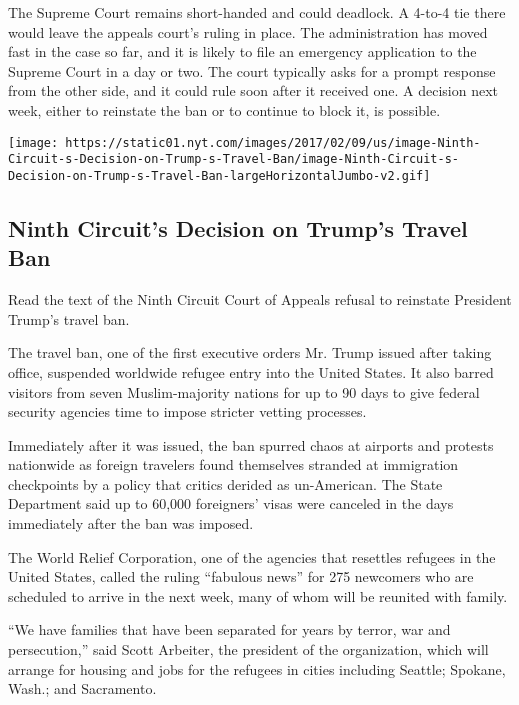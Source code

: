 The Supreme Court remains short-handed and could deadlock. A 4-to-4 tie
there would leave the appeals court's ruling in place. The
administration has moved fast in the case so far, and it is likely to
file an emergency application to the Supreme Court in a day or two. The
court typically asks for a prompt response from the other side, and it
could rule soon after it received one. A decision next week, either to
reinstate the ban or to continue to block it, is possible.

\href{https://www.nytimes.com/interactive/2017/02/09/us/document-Ninth-Circuit-s-Decision-on-Trump-s-Travel-Ban.html}{}

\texttt{[image: https://static01.nyt.com/images/2017/02/09/us/image-Ninth-Circuit-s-Decision-on-Trump-s-Travel-Ban/image-Ninth-Circuit-s-Decision-on-Trump-s-Travel-Ban-largeHorizontalJumbo-v2.gif]}

\hypertarget{ninth-circuits-decision-on-trumps-travel-ban}{%
\subsection{Ninth Circuit's Decision on Trump's Travel
Ban}\label{ninth-circuits-decision-on-trumps-travel-ban}}

Read the text of the Ninth Circuit Court of Appeals refusal to reinstate
President Trump's travel ban.

The travel ban, one of the first executive orders Mr. Trump issued after
taking office, suspended worldwide refugee entry into the United States.
It also barred visitors from seven Muslim-majority nations for up to 90
days to give federal security agencies time to impose stricter vetting
processes.

Immediately after it was issued, the ban spurred chaos at airports and
protests nationwide as foreign travelers found themselves stranded at
immigration checkpoints by a policy that critics derided as un-American.
The State Department said up to 60,000 foreigners' visas were canceled
in the days immediately after the ban was imposed.

The World Relief Corporation, one of the agencies that resettles
refugees in the United States, called the ruling ``fabulous news'' for
275 newcomers who are scheduled to arrive in the next week, many of whom
will be reunited with family.

``We have families that have been separated for years by terror, war and
persecution,'' said Scott Arbeiter, the president of the organization,
which will arrange for housing and jobs for the refugees in cities
including Seattle; Spokane, Wash.; and Sacramento.

